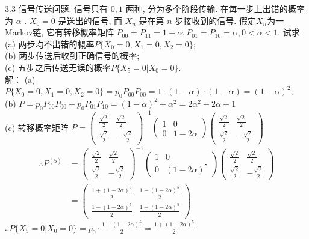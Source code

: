 3.3 信号传送问题. 信号只有 $0,1$ 两种, 分为多个阶段传输. 在每一步上出错的概率为 $\alpha$ . $X_0 = 0$ 是送出的信号, 而 $X_n$ 是在第 $n$ 步接收到的信号. 假定$X_n$为一Markov链, 它有转移概率矩阵 $P_{00} = P_{11} = 1 - \alpha , P_{01} = P_{10} = \alpha, 0 < \alpha < 1$. 试求\\
(a) 两步均不出错的概率$P\{X_0 = 0, X_1 = 0, X_2 = 0\}$;\\
(b) 两步传送后收到正确信号的概率;\\
(c) 五步之后传送无误的概率$P\{X_5 = 0 | X_0 = 0\}$.\\
解：
(a) $P\{X_0 = 0, X_1 = 0, X_2 = 0\} = p_0P_{00}P_{00} = 1 \cdot (1-\alpha) \cdot (1-\alpha) = (1-\alpha)^2$;\\
(b) $P = p_0P_{00}P_{00} + p_0P_{01}P_{10} = (1-\alpha)^2 + {\alpha}^2 = 2{\alpha}^2 - 2\alpha + 1$\\
(c) 转移概率矩阵
	$
	P = \begin{pmatrix} \frac{\sqrt{2}}{2} & \frac{\sqrt{2}}{2}\\ \frac{\sqrt{2}}{2} & -\frac{\sqrt{2}}{2} \end{pmatrix}^{-1}
	\begin{pmatrix} 1 & 0 \\ 0 & 1-2\alpha \end{pmatrix}
	\begin{pmatrix} \frac{\sqrt{2}}{2} & \frac{\sqrt{2}}{2}\\ \frac{\sqrt{2}}{2} & -\frac{\sqrt{2}}{2} \end{pmatrix}
	$\\
	\[
	\begin{aligned}
	\therefore P^{(5)} & =  
		\begin{pmatrix} \frac{\sqrt{2}}{2} & \frac{\sqrt{2}}{2}\\ \frac{\sqrt{2}}{2} & -\frac{\sqrt{2}}{2} \end{pmatrix}^{-1}
		\begin{pmatrix} 1 & 0 \\ 0 & (1-2\alpha)^5 \end{pmatrix}
		\begin{pmatrix} \frac{\sqrt{2}}{2} & \frac{\sqrt{2}}{2}\\ \frac{\sqrt{2}}{2} & -\frac{\sqrt{2}}{2} \end{pmatrix}\\
					& = \begin{pmatrix}
					\frac{1+(1-2\alpha)^5}{2} & \frac{1-(1-2\alpha)^5}{2}\\ \frac{1-(1-2\alpha)^5}{2}& \frac{1+(1-2\alpha)^5}{2}
					\end{pmatrix}
	\end{aligned}
	\]
	$\therefore P\{ X_5 = 0 | X_0 = 0\} = p_0 \cdot \frac{1+(1-2\alpha)^5}{2} = \frac{1+(1-2\alpha)^5}{2}$\\


